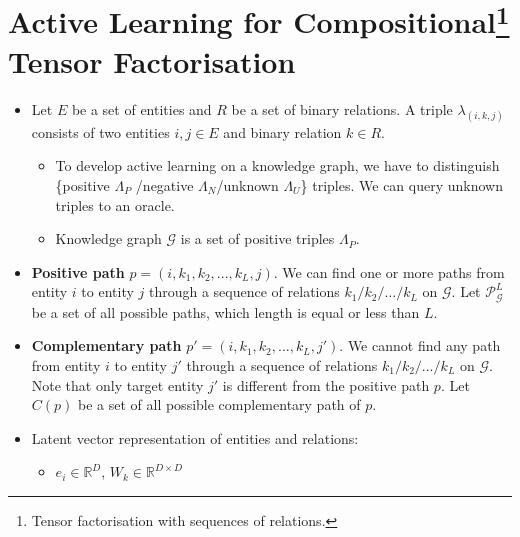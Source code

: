 \documentclass{article}
\theoremstyle{definition}
\begin{document}
 
\section[ctf]{Active Learning for Compositional\footnote{Tensor factorisation with sequences of relations\cite{gu2015traversing}.} Tensor Factorisation}

\begin{itemize}
\item Let $E$ be a set of entities and $R$ be a set of binary relations. A triple $\lambda_{(i, k, j)}$ consists of two entities $i,j\in E$ and binary relation $k \in R$.
\begin{itemize}
\item To develop active learning on a knowledge graph, we have to distinguish \{positive $\Lambda_P$ /negative $\Lambda_N$/unknown $\Lambda_U$\} triples. We can query unknown triples to an oracle.
\item Knowledge graph $\mathcal{G}$ is a set of positive triples $\Lambda_P$. 
\end{itemize}

\item \textbf{Positive path} $p = (i, {k_1}, {k_2}, ... , {k_L}, j)$. We can find one or more paths from entity $i$ to entity $j$ through a sequence of relations $k_1 / k_2 / \dots / k_L$ on $\mathcal{G}$. Let $\mathcal{P}_\mathcal{G}^L$ be a set of all possible paths, which length is equal or less than $L$.

\item \textbf{Complementary path} $p' = (i, {k_1}, {k_2}, ... , {k_L}, {j'})$. We cannot find any path from entity $i$ to entity $j'$ through a sequence of relations $k_1 / k_2 / \dots / k_L$ on  $\mathcal{G}$. Note that only target entity $j'$ is different from the positive path $p$. Let $C(p)$ be a set of all possible complementary path of $p$.



\item Latent vector representation of entities and relations:
\begin{itemize}
\item $e_i \in \mathbb{R}^{D}$, $W_k \in \mathbb{R}^{D\times D}$
\end{itemize}


\end{itemize}
\end{document}
